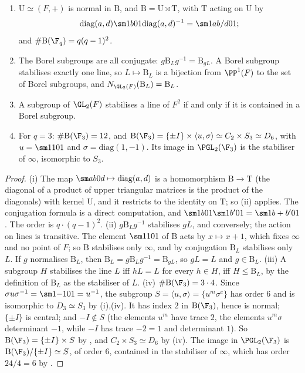 \begin{proposition}\label{prop:groups:borel}
\begin{enumerate}[label=(\roman*)]
\item $\mathrm U\simeq(F,+)$ is normal in $\mathrm B$, and $\mathrm B=\mathrm U\rtimes\mathrm T$, with $\mathrm T$ acting on $\mathrm U$ by
\[\mathrm{diag}(a,d)\sm1b01\mathrm{diag}(a,d)^{-1}=\sm1{ab/d}01;\]
and $\#\mathrm B(\F_q)=q(q-1)^2$.
\item The Borel subgroups are all conjugate: $g\mathrm B_Lg^{-1}=\mathrm B_{gL}$. A Borel subgroup stabilises exactly one line, so $L\mapsto\mathrm B_L$ is a bijection from
$\PP^1(F)$ to the set of Borel subgroups, and $N_{\GL_2(F)}(\mathrm B_L)=\mathrm B_L$.
\item A subgroup of $\GL_2(F)$ stabilises a line of $F^2$ if and only if it is contained in a Borel subgroup.
\item For $q=3$: $\#\mathrm B(\F_3)=12$, and $\mathrm B(\F_3)=\{\pm I\}\times\langle u,\sigma\rangle\simeq C_2\times S_3\simeq D_6$, with $u=\sm1101$ and $\sigma=\mathrm{diag}(1,-1)$. Its image in
$\PGL_2(\F_3)$ is the stabiliser of $\infty$, isomorphic to $S_3$.
\end{enumerate}
\end{proposition}

\begin{proof}
(i) The map $\sm ab0d\mapsto\mathrm{diag}(a,d)$ is a homomorphism $\mathrm B\to\mathrm T$ (the diagonal of a product of upper triangular matrices is the product of the
diagonals) with kernel $\mathrm U$, and it restricts to the identity on $\mathrm T$; so (ii) applies. The conjugation formula is a direct
computation, and $\sm1b01\sm1{b'}01=\sm1{b+b'}01$. The order is $q\cdot(q-1)^2$. (ii) $g\mathrm B_Lg^{-1}$ stabilises $gL$, and conversely; the action on lines is
transitive. The element $\sm1101$ of $\mathrm B$ acts by $x\mapsto x+1$, which fixes $\infty$ and no point of $F$; so $\mathrm B$ stabilises only $\infty$, and by conjugation $\mathrm B_L$ stabilises only $L$. If $g$ normalises $\mathrm B_L$, then $\mathrm B_L=g\mathrm B_Lg^{-1}=\mathrm B_{gL}$, so $gL=L$ and
$g\in\mathrm B_L$. (iii) A subgroup $H$ stabilises the line $L$ iff $hL=L$ for every $h\in H$, iff $H\le\mathrm B_L$, by the definition of $\mathrm B_L$ as
the stabiliser of $L$. (iv) $\#\mathrm B(\F_3)=3\cdot4$. Since $\sigma u\sigma^{-1}=\sm1{-1}01=u^{-1}$, the subgroup $S=\langle u,\sigma\rangle=\{u^m\sigma^e\}$ has order $6$ and is
isomorphic to $D_3\simeq S_3$ by (i),(iv). It has index $2$ in $\mathrm B(\F_3)$, hence is normal; $\{\pm I\}$ is central; and $-I\notin S$
(the elements $u^m$ have trace $2$, the elements $u^m\sigma$ determinant $-1$, while $-I$ has trace $-2=1$ and determinant $1$). So
$\mathrm B(\F_3)=\{\pm I\}\times S$ by , and $C_2\times S_3\simeq D_6$ by (iv). The image in $\PGL_2(\F_3)$ is
$\mathrm B(\F_3)/\{\pm I\}\simeq S$, of order $6$, contained in the stabiliser of $\infty$, which has order $24/4=6$ by .
\end{proof}

